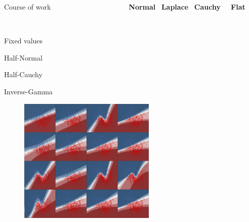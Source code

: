 \documentclass{beamer}
\begin{document}
\begin{frame}{Course of work}
	$\qquad\qquad\qquad\qquad\qquad\:\:\:$\textbf{Normal}$\:\:\:\,$\textbf{Laplace}$\:\:\:\,$\textbf{Cauchy}$\quad\:\:$\textbf{Flat}
	
	\begin{minipage}[t]{0.1\columnwidth}
		\vspace{0.5cm}
	\end{minipage}\
	\begin{minipage}[t]{0.23\columnwidth}
	\vspace{0.65cm}
	Fixed values
	
	\vspace{1.05cm}
	
	Half-Normal
	
	\vspace{1.03cm}
	
	Half-Cauchy
	
	\vspace{1.01cm}
	
	Inverse-Gamma
	\end{minipage}
	\begin{minipage}[t]{0.62\columnwidth}
		\begin{figure}
			\includegraphics[height=6cm]{pres_pics/all.png}
		\end{figure}
	\end{minipage}
	
	
\end{frame}
\end{document}
